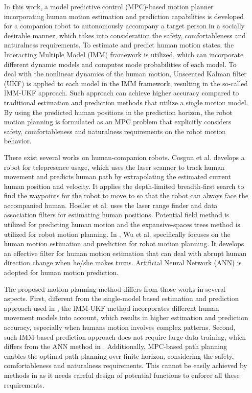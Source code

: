 \documentclass[letterpaper, 10 pt, conference]{ieeeconf}
\begin{document}
In this work, a model predictive control (MPC)-based motion planner incorporating human motion estimation and prediction capabilities is developed for a companion robot to autonomously accompany a target person in a socially desirable manner, which takes into consideration the safety, comfortableness and naturalness requirements. 
To estimate and predict human motion states, the Interacting Multiple Model (IMM) framework is utilized, which can incorporate different dynamic models and computes mode probabilities of each model. 
To deal with the nonlinear dynamics of the human motion, Unscented Kalman filter (UKF) is applied to each model in the IMM framework, resulting in the so-called IMM-UKF approach. 
Such approach can achieve higher accuracy compared to traditional estimation and prediction methods that utilize a single motion model. 
By using the predicted human positions in the prediction horizon, the robot motion planning is formulated as an MPC problem that explicitly considers safety, comfortableness and naturalness requirements on the robot motion behavior. 

There exist several works on human-companion robots. 
Cosgun et al.\cite{cosgun2013autonomous} develops a robot for telepresence usage, which uses the laser scanner to track human movement and predicts human path by extrapolating the estimated current human position and velocity.
It applies the depth-limited breadth-first search to find the waypoints for the robot to move to so that the robot can always face the accompanied human. 
Hoeller et al.\cite{hoeller2007accompanying} uses the laser range finder and data association filters for estimating human positions. 
Potential field method is utilized for predicting human motion and the expansive-spaces trees method is utilized for robot motion planning.
In \cite{wu2012path}, Wu et al. specifically focuses on the human motion estimation and prediction for robot motion planning.
It develops an effective filter for human motion estimation that can deal with abrupt human direction change when he/she makes turns. 
Artificial Neural Network (ANN) is adopted for human motion prediction. 

The proposed motion planning method differs from those works in several aspects.
First, different from the single-model based estimation and prediction approach used in \cite{cosgun2013autonomous},  the IMM-UKF method incorporates different human movement models into account, which results in higher estimation and prediction accuracy, especially when humans motion involves complex patterns.
Second, such IMM-based prediction approach does not require large data training, which differs from the ANN method in \cite{wu2012path}. 
Additionally, MPC-based path planning enables the optimal path planning over finite horizon, considering the safety, comfortableness and naturalness requirements.
This cannot be easily achieved by methods in \cite{hoeller2007accompanying} as it needs careful design of potential functions to enforce all these requirements.
\end{document}
